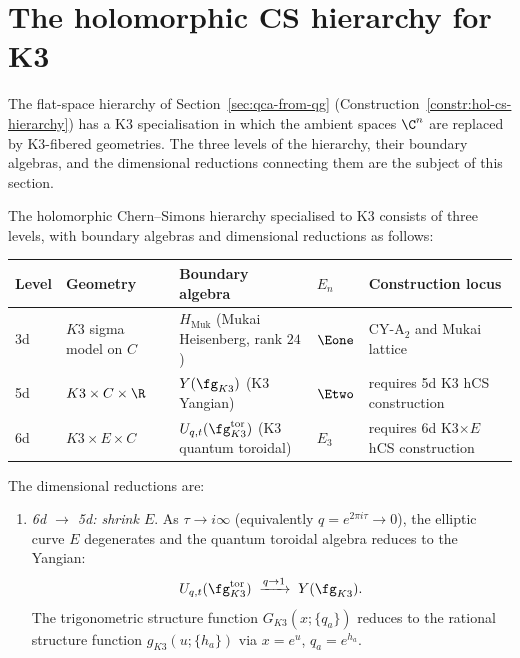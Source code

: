 
\section{The holomorphic CS hierarchy for K3}
\label{sec:hcs-k3-hierarchy}

The flat-space hierarchy of Section~\ref{sec:qca-from-qg} (Construction~\ref{constr:hol-cs-hierarchy}) has a K3 specialisation in which the ambient spaces $\C^n$ are replaced by K3-fibered geometries. The three levels of the hierarchy, their boundary algebras, and the dimensional reductions connecting them are the subject of this section.

\begin{conjecture}
\label{conj:hcs-k3-hierarchy}
\ClaimStatusConjectured
The holomorphic Chern--Simons hierarchy specialised to K3 consists of three levels, with boundary algebras and dimensional reductions as follows:
\begin{center}
\small
\renewcommand{\arraystretch}{1.3}
\begin{tabular}{lllll}
\toprule
\textbf{Level} & \textbf{Geometry} & \textbf{Boundary algebra} & $E_n$ & \textbf{Construction locus} \\
\midrule
3d & $K3$ sigma model on $C$ & $H_{\mathrm{Muk}}$ (Mukai Heisenberg, rank $24$) & $\Eone$ & CY-A$_2$ and Mukai lattice \\
5d & $K3 \times C \times \R$ & $Y(\fg_{K3})$ (K3 Yangian) & $\Etwo$ & requires 5d K3 hCS construction \\
6d & $K3 \times E \times C$ & $U_{q,t}(\fg_{K3}^{\mathrm{tor}})$ (K3 quantum toroidal) & $E_3$ & requires 6d K3$\times E$ hCS construction \\
\bottomrule
\end{tabular}
\end{center}
The dimensional reductions are:
\begin{enumerate}[label=\textup{(\roman*)}]
 \item \emph{6d $\to$ 5d: shrink $E$}. As $\tau \to i\infty$ (equivalently $q = e^{2\pi i \tau} \to 0$), the elliptic curve $E$ degenerates and the quantum toroidal algebra reduces to the Yangian:
 \[
 U_{q,t}(\fg_{K3}^{\mathrm{tor}}) \;\xrightarrow{q \to 1}\; Y(\fg_{K3}).
 \]
 The trigonometric structure function $G_{K3}(x; \{q_a\})$ reduces to the rational structure function $g_{K3}(u; \{h_a\})$ via $x = e^u$, $q_a = e^{h_a}$.


\end{enumerate}
\end{conjecture}
